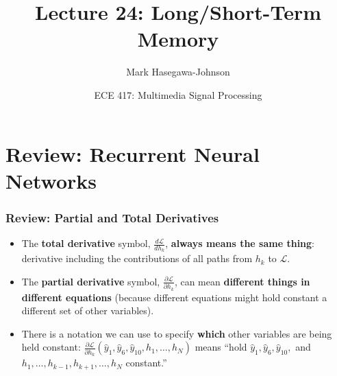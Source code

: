 \documentclass{beamer}
\title{Lecture 24: Long/Short-Term Memory}
\author{Mark Hasegawa-Johnson}
\date{ECE 417: Multimedia Signal Processing}
\institute{University of Illinois}
\begin{document}
\begin{frame}
  \maketitle
\end{frame}

\begin{frame}
  \tableofcontents
\end{frame}


\section[Review]{Review: Recurrent Neural Networks}
\setcounter{subsection}{1}

\begin{frame}
  \frametitle{Review: Partial and Total Derivatives}
  \begin{itemize}
  \item The {\bf total derivative} symbol, $\frac{d{\mathcal
      L}}{dh_k}$, {\bf always means the same thing}: derivative
    including the contributions of all paths from $h_k$ to ${\mathcal
      L}$.
  \item The {\bf partial derivative} symbol, $\frac{\partial{\mathcal
      L}}{\partial h_k}$, can mean {\bf different things in different
    equations} (because different equations might hold constant a
    different set of other variables).
  \item There is a notation we can use to specify {\bf which} other
    variables are being held constant: $\frac{\partial{\mathcal
        L}}{\partial
      h_k}(\hat{y}_1,\hat{y}_6,\hat{y}_{10},h_1,\ldots,h_N)$ means
    ``hold $\hat{y}_1,\hat{y}_6,\hat{y}_{10},$ and
    $h_1,\ldots,h_{k-1},h_{k+1},\ldots,h_N$ constant.''
  \end{itemize}
\end{frame}
\end{document}
